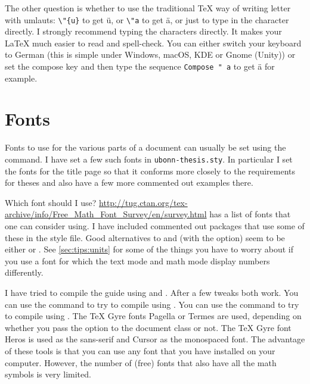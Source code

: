The other question is whether to use the traditional \TeX{} way of
writing letter with umlauts: \verb+\"{u}+ to get \"{u}, or \verb+\"a+
to get \"a, or just to type in the character directly. I strongly
recommend typing the characters directly. It makes your \LaTeX{} much
easier to read and spell-check. You can either switch your keyboard to
German (this is simple under Windows, macOS, KDE or Gnome (Unity)) or set the
compose key and then type the sequence \texttt{Compose " a} to get ä for example. %


\section{Fonts}%
\label{sec:layout:font}

Fonts to use for the various parts of a
document can usually be set using the  command.
I have set a few such fonts in \texttt{ubonn-thesis.sty}.
In particular
I set the fonts for the title page so that it conforms more closely to
the requirements for theses and also have a few more commented out
examples there.

Which font should I use?
\url{http://tug.ctan.org/tex-archive/info/Free_Math_Font_Survey/en/survey.html}
has a list of fonts that one can consider using.
I have included
commented out packages that use some of these in the style file.
Good alternatives to  and  (with the  option) seem
to be either  or .
See \cref{sec:tips:units} for some of the things you have to worry
about if you use a font for which the text mode and math mode display
numbers differently.

I have tried to compile the guide using \XeLaTeX{} and \LuaLaTeX{}.
After a few tweaks both work.
You can use the command  to try to compile using \XeLaTeX.
You can use the command  to try to compile using \LuaLaTeX.
The TeX Gyre fonts Pagella or Termes are used, depending on whether you pass the
 option to the document class or not.
The TeX Gyre font Heros is used as the sans-serif and Cursor as the monospaced font.
The advantage of these tools is that you can use any font that you have installed on your computer.
However, the number of (free) fonts that also have all the math symbols is very limited.


